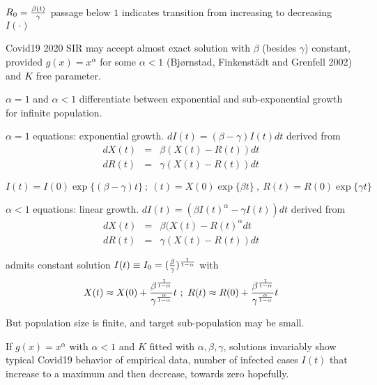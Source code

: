 \documentclass{article}
\begin{document}
 $R_0={\beta(t) \over \gamma}$ passage below $1$ indicates transition from increasing to decreasing $I(\cdot)$

\newpage

\noindent Covid19 2020 SIR may accept almost exact solution with $\beta$ (besides $\gamma$) constant, provided $g(x)=x^\alpha$
for some $\alpha<1$ (Bj{\o}rnstad, Finkenst\"{a}dt and Grenfell 2002) and $K$ free parameter.

\bigskip

 $\alpha=1$ and $\alpha<1$ differentiate between exponential and sub-exponential growth for infinite population.

\bigskip

\noindent $\alpha=1$ equations: exponential growth. $d I(t) = (\beta-\gamma) I(t) dt$ derived from
\begin{eqnarray}
d X(t) & = & \beta (X(t)-R(t)) dt \nonumber \\
d R(t) & = & \gamma (X(t)-R(t)) dt \nonumber
\end{eqnarray}

$$
I(t)=I(0)\exp\{(\beta-\gamma)t\} \ ; \ (t)=X(0)\exp\{\beta t\} \ , \ R(t)=R(0)\exp\{\gamma t\}
$$

\bigskip

\noindent $\alpha<1$ equations: linear growth. $d I(t) = (\beta I(t)^\alpha - \gamma I(t))dt$ derived from
\begin{eqnarray}
dX(t) & = & \beta (X(t)-R(t)^\alpha dt \nonumber \\
dR(t) & = & \gamma (X(t)-R(t)) dt \nonumber
\end{eqnarray}

\noindent admits constant solution $I(t) \equiv I_0 = ({\beta \over \gamma})^{1 \over {1-\alpha}}$ with
$$
X(t) \approx X(0)+{{\beta^{1 \over {1-\alpha}}} \over {\gamma^{\alpha \over {1-\alpha}}}} t  \ ; \ R(t) \approx R(0)+{{\beta^{1 \over {1-\alpha}}} \over {\gamma^{\alpha \over {1-\alpha}}}} t
$$


\newpage

\noindent But population size is finite, and target sub-population may be small.

\bigskip

\noindent If $g(x)=x^\alpha$ with $\alpha<1$ and $K$ fitted with $\alpha, \beta, \gamma$, solutions invariably show typical Covid19 behavior of empirical data, number of infected cases $I(t)$ that increase to a maximum and then decrease, towards zero hopefully.
\end{document}
